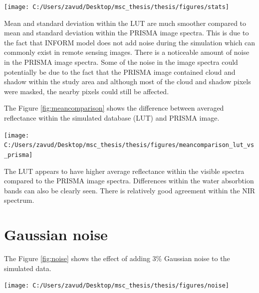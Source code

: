 \documentclass[a4paper, twoside]{templates/ociamthesis}
\let\origfigure\figure
\let\endorigfigure\endfigure
\renewenvironment{figure}[1][2] {
    \expandafter\origfigure\expandafter[H]
} {
    \endorigfigure
}
\begin{document}
\begin{figure}
\texttt{[image: C:/Users/zavud/Desktop/msc\_thesis/thesis/figures/stats]} \caption{Mean and mean $\pm$ standard deviation in the a) LUT and b) PRISMA image}\label{fig:statplots}
\end{figure}

Mean and standard deviation within the LUT are much smoother compared to mean and standard deviation within the PRISMA image spectra. This is due to the fact that INFORM model does not add noise during the simulation which can commonly exist in remote sensing images. There is a noticeable amount of noise in the PRISMA image spectra. Some of the noise in the image spectra could potentially be due to the fact that the PRISMA image contained cloud and shadow within the study area and although most of the cloud and shadow pixels were masked, the nearby pixels could still be affected.

The Figure \ref{fig:meancomparison} shows the difference between averaged reflectance within the simulated database (LUT) and PRISMA image.

\begin{figure}

{\centering \texttt{[image: C:/Users/zavud/Desktop/msc\_thesis/thesis/figures/meancomparison\_lut\_vs\_prisma]} 

}

\caption{Difference between averaged LUT and PRISMA image reflectance}\label{fig:meancomparison}
\end{figure}

The LUT appears to have higher average reflectance within the visible spectra compared to the PRISMA image spectra. Differences within the water absorbtion bands can also be clearly seen. There is relatively good agreement within the NIR spectrum.

\newpage

\hypertarget{gaussian-noise-1}{%
\section{Gaussian noise}\label{gaussian-noise-1}}

The Figure \ref{fig:noise} shows the effect of adding 3\% Gaussian noise to the simulated data.

\begin{figure}
\texttt{[image: C:/Users/zavud/Desktop/msc\_thesis/thesis/figures/noise]} \caption{Effect of adding $3\%$ Gaussian noise to the simulated spectra. The randomly chosen pixel from the PRISMA data was plotted to illustrate the noise found typically in the image}\label{fig:noise}
\end{figure}
\end{document}
